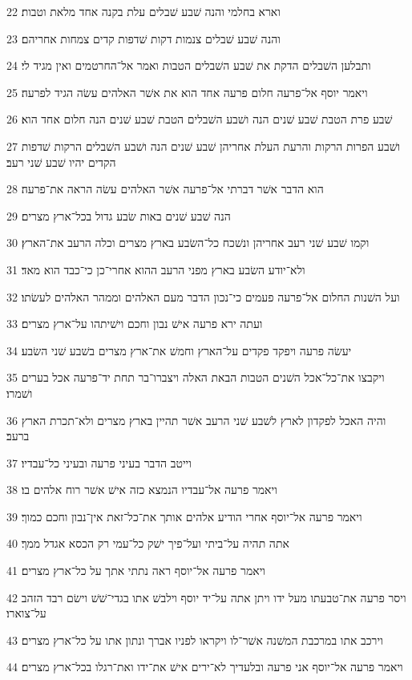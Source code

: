 \par 22 וארא בחלמי והנה שׁבע שׁבלים עלת בקנה אחד מלאת וטבות׃
\par 23 והנה שׁבע שׁבלים צנמות דקות שׁדפות קדים צמחות אחריהם׃
\par 24 ותבלען השׁבלים הדקת את שׁבע השׁבלים הטבות ואמר אל־החרטמים ואין מגיד לי׃
\par 25 ויאמר יוסף אל־פרעה חלום פרעה אחד הוא את אשׁר האלהים עשׂה הגיד לפרעה׃
\par 26 שׁבע פרת הטבת שׁבע שׁנים הנה ושׁבע השׁבלים הטבת שׁבע שׁנים הנה חלום אחד הוא׃
\par 27 ושׁבע הפרות הרקות והרעת העלת אחריהן שׁבע שׁנים הנה ושׁבע השׁבלים הרקות שׁדפות הקדים יהיו שׁבע שׁני רעב׃
\par 28 הוא הדבר אשׁר דברתי אל־פרעה אשׁר האלהים עשׂה הראה את־פרעה׃
\par 29 הנה שׁבע שׁנים באות שׂבע גדול בכל־ארץ מצרים׃
\par 30 וקמו שׁבע שׁני רעב אחריהן ונשׁכח כל־השׂבע בארץ מצרים וכלה הרעב את־הארץ׃
\par 31 ולא־יודע השׂבע בארץ מפני הרעב ההוא אחרי־כן כי־כבד הוא מאד׃
\par 32 ועל השׁנות החלום אל־פרעה פעמים כי־נכון הדבר מעם האלהים וממהר האלהים לעשׂתו׃
\par 33 ועתה ירא פרעה אישׁ נבון וחכם וישׁיתהו על־ארץ מצרים׃
\par 34 יעשׂה פרעה ויפקד פקדים על־הארץ וחמשׁ את־ארץ מצרים בשׁבע שׁני השׂבע׃
\par 35 ויקבצו את־כל־אכל השׁנים הטבות הבאת האלה ויצברו־בר תחת יד־פרעה אכל בערים ושׁמרו׃
\par 36 והיה האכל לפקדון לארץ לשׁבע שׁני הרעב אשׁר תהיין בארץ מצרים ולא־תכרת הארץ ברעב׃
\par 37 וייטב הדבר בעיני פרעה ובעיני כל־עבדיו׃
\par 38 ויאמר פרעה אל־עבדיו הנמצא כזה אישׁ אשׁר רוח אלהים בו׃
\par 39 ויאמר פרעה אל־יוסף אחרי הודיע אלהים אותך את־כל־זאת אין־נבון וחכם כמוך׃
\par 40 אתה תהיה על־ביתי ועל־פיך ישׁק כל־עמי רק הכסא אגדל ממך׃
\par 41 ויאמר פרעה אל־יוסף ראה נתתי אתך על כל־ארץ מצרים׃
\par 42 ויסר פרעה את־טבעתו מעל ידו ויתן אתה על־יד יוסף וילבשׁ אתו בגדי־שׁשׁ וישׂם רבד הזהב על־צוארו׃
\par 43 וירכב אתו במרכבת המשׁנה אשׁר־לו ויקראו לפניו אברך ונתון אתו על כל־ארץ מצרים׃
\par 44 ויאמר פרעה אל־יוסף אני פרעה ובלעדיך לא־ירים אישׁ את־ידו ואת־רגלו בכל־ארץ מצרים׃
